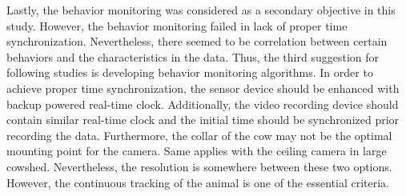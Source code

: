 \documentclass[english,12pt,a4paper,pdftex,elec,utf8]{aaltothesis}
\begin{document}
Lastly, the behavior monitoring was considered as a secondary objective in this study. However, the behavior monitoring failed in lack of proper time synchronization. Nevertheless, there seemed to be correlation between certain behaviors and the characteristics in the data. Thus, the third suggestion for following studies is developing behavior monitoring algorithms. In order to achieve proper time synchronization, the sensor device should be enhanced with backup powered real-time clock. Additionally, the video recording device should contain similar real-time clock and the initial time should be synchronized prior recording the data. Furthermore, the collar of the cow may not be the optimal mounting point for the camera. Same applies with the ceiling camera in large cowshed. Nevertheless, the resolution is somewhere between these two options. However, the continuous tracking of the animal is one of the essential criteria.


\clearpage





\clearpage

\thesisbibliography
\printbibliography




\clearpage

\thesisappendix

%
\end{document}
